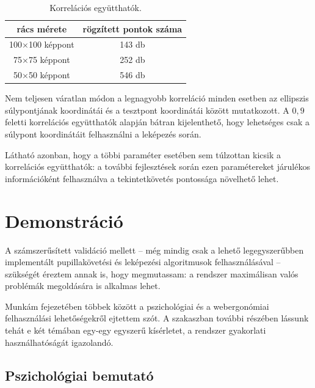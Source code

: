 \begin{table}[ht]
	\centering
	\caption{Korrelációs együtthatók.} \label{tab:korrel}
	\begin{tabular}{ c | c }
	rács mérete & rögzített pontok száma \\ \hline \hline
	100$\times$100 képpont & 143 db \\
	75$\times$75 képpont & 252 db \\
	50$\times$50 képpont & 546 db \\
	\end{tabular}
\end{table}

Nem teljesen váratlan módon a legnagyobb korreláció minden esetben az ellipszis súlypontjának koordinátái és a tesztpont koordinátái között mutatkozott. A $0,\!9$ feletti korrelációs együtthatók alapján bátran kijelenthető, hogy lehetséges csak a súlypont koordinátáit felhasználni a leképezés során.

Látható azonban, hogy a többi paraméter esetében sem túlzottan kicsik a korrelációs együtthatók: a további fejlesztések során ezen paramétereket járulékos információként felhasználva a tekintetkövetés pontossága növelhető lehet.

\section{Demonstráció}\label{sect:demonstracio}

A számszerűsített validáció mellett -- még mindig csak a lehető legegyszerűbben implementált pupillakövetési és leképezési algoritmusok felhasználásával -- szükségét éreztem annak is, hogy megmutassam: a rendszer maximálisan valós problémák megoldására is alkalmas lehet.

Munkám  fejezetében többek között a pszichológiai és a webergonómiai felhasználási lehetőségekről ejtettem szót. A szakaszban további részében lássunk tehát e két témában egy-egy egyszerű kísérletet, a rendszer gyakorlati használhatóságát igazolandó. 

\subsection{Pszichológiai bemutató}\label{sect:pszicho}

